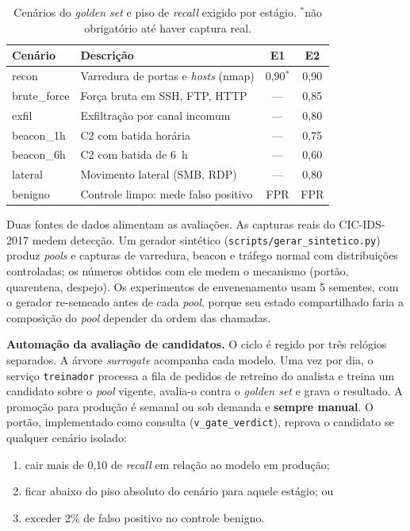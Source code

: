 \documentclass[a4paper,10pt, twocolumn]{article}
\begin{document}
\begin{table}[H]
\centering
\footnotesize
\setlength{\tabcolsep}{3pt}
\begin{tabularx}{\columnwidth}{l X c c}
\toprule
\textbf{Cenário} & \textbf{Descrição} & \textbf{E1} & \textbf{E2} \\
\midrule
recon        & Varredura de portas e \textit{hosts} (nmap) & 0,90$^*$ & 0,90 \\
brute\_force & Força bruta em SSH, FTP, HTTP & --- & 0,85 \\
exfil        & Exfiltração por canal incomum & --- & 0,80 \\
beacon\_1h   & C2 com batida horária & --- & 0,75 \\
beacon\_6h   & C2 com batida de 6~h & --- & 0,60 \\
lateral      & Movimento lateral (SMB, RDP) & --- & 0,80 \\
benigno      & Controle limpo: mede falso positivo & FPR & FPR \\
\bottomrule
\end{tabularx}
\caption{Cenários do \textit{golden set} e piso de \textit{recall} exigido por estágio. $^*$não obrigatório até haver captura real.}
\label{tab:cenarios}
\end{table}

Duas fontes de dados alimentam as avaliações. As capturas
reais do CIC-IDS-2017 medem detecção. Um gerador sintético
(\texttt{scripts/gerar\_sintetico.py}) produz \textit{pools} e capturas de varredura,
beacon e tráfego normal com distribuições controladas; os números obtidos com ele
medem o mecanismo (portão, quarentena, despejo). Os experimentos de envenenamento usam 5 sementes, com o gerador
re-semeado antes de cada \textit{pool}, porque seu estado compartilhado faria a
composição do \textit{pool} depender da ordem das chamadas.

\textbf{Automação da avaliação de candidatos.} O ciclo é regido por três relógios
separados. A árvore \textit{surrogate} acompanha cada modelo. Uma vez por dia, o
serviço \texttt{treinador} processa a fila de pedidos de retreino do analista e treina
um candidato sobre o \textit{pool} vigente, avalia-o contra o \textit{golden set} e grava o
resultado. A promoção para produção é
semanal ou sob demanda e \textbf{sempre manual}. O portão, implementado como
consulta (\texttt{v\_gate\_verdict}), reprova o candidato se qualquer cenário
isolado:

\begin{enumerate}
  \item cair mais de 0,10 de \textit{recall} em relação ao modelo em produção;
  \item ficar abaixo do piso absoluto do cenário para aquele estágio; ou
  \item exceder 2\% de falso positivo no controle benigno.
\end{enumerate}
\end{document}
